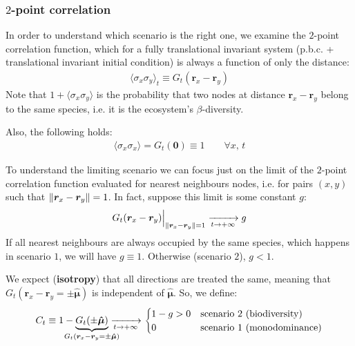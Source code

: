 \documentclass[../../main.tex]{subfiles}
\begin{document}
\subsubsection{$2$-point correlation}
In order to understand which scenario is the right one, we examine the $2$-point correlation function, which for a fully translational invariant system (p.b.c. + translational invariant initial condition) is always a function of only the distance:
\begin{align*}
    \langle \sigma_x \sigma_y \rangle_t \equiv G_t(\bm{r}_x - \bm{r}_y)
\end{align*}
Note that $1 + \langle \sigma_x \sigma_y \rangle$ is the probability that two nodes at distance $\bm{r}_x - \bm{r}_y$ belong to the same species, i.e. it is the ecosystem's $\beta$-diversity.

\medskip

Also, the following holds:
\begin{align*}
    \langle \sigma_x \sigma_x \rangle = G_t(\bm{0}) \equiv 1 \qquad \forall x, \, t
\end{align*}

\medskip

To understand the limiting scenario we can focus just on the limit of the $2$-point correlation function evaluated for nearest neighbours nodes, i.e. for pairs $(x,y)$ such that $\norm{\bm{r}_x - \bm{r}_y} = 1$. 
In fact, suppose this limit is some constant $g$:
\begin{align*}
    G_t(\bm{r}_x-\bm{r}_y) \Big|_{\norm{\bm{r}_x - \bm{r}_y}=1}  \xrightarrow[t \to +\infty]{}  g
\end{align*}
If all nearest neighbours are always occupied by the same species, which happens in scenario $1$, we will have $g \equiv 1$. Otherwise (scenario $2$), $g < 1$.

\medskip

We expect (\textbf{isotropy}) that all directions are treated the same, meaning that $G_t(\bm{r}_x - \bm{r}_y = \pm \bm{\hat{\mu}})$ is independent of $\bm{\hat{\mu}}$. So, we define:
\begin{align}\label{eqn:C-t}
    C_t \equiv 1 - \underbrace{G_t(\pm \bm{\hat{\mu}})}_{\mathclap{G_t(\bm{r}_x - \bm{r}_y = \pm \bm{\hat{\mu}})}}  \xrightarrow[t \to +\infty]{}  \begin{cases}
        1-g > 0 & \text{scenario $2$ (biodiversity)}\\
        0 & \text{scenario $1$ (monodominance)}
    \end{cases} 
\end{align}
\end{document}
